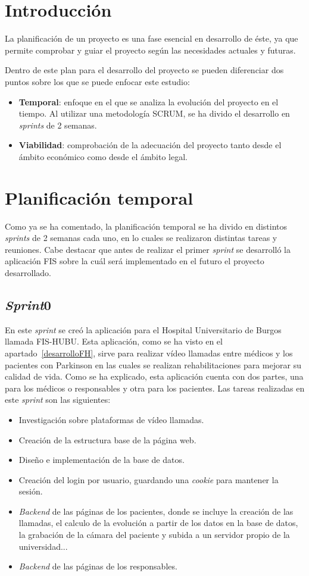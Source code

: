 
\section{Introducción}
La planificación de un proyecto es una fase esencial en desarrollo de éste, ya que permite comprobar y guiar el proyecto según las necesidades actuales y futuras.

Dentro de este plan para el desarrollo del proyecto se pueden diferenciar dos puntos sobre los que se puede enfocar este estudio:
\begin{itemize}
	\item \textbf{Temporal}: enfoque en el que se analiza la evolución del proyecto en el tiempo. Al utilizar una metodología SCRUM, se ha divido el desarrollo en \textit{sprints} de 2 semanas.
	\item \textbf{Viabilidad}: comprobación de la adecuación del proyecto tanto desde el ámbito económico como desde el ámbito legal.
\end{itemize}
\section{Planificación temporal}
Como ya se ha comentado, la planificación temporal se ha divido en distintos \textit{sprints} de 2 semanas cada uno, en lo cuales se realizaron distintas tareas y reuniones. Cabe destacar que antes de realizar el primer \textit{sprint} se desarrolló la aplicación FIS sobre la cuál será implementado en el futuro el proyecto desarrollado.

\subsection{\textit{Sprint}0}
En este \textit{sprint} se creó la aplicación para el Hospital Universitario de Burgos llamada FIS-HUBU. Esta aplicación, como se ha visto en el apartado~\ref{desarrolloFH}, sirve para realizar vídeo llamadas entre médicos y los pacientes con Parkinson en las cuales se realizan rehabilitaciones para mejorar su calidad de vida. Como se ha explicado, esta aplicación cuenta con dos partes, una para los médicos o responsables y otra para los pacientes. Las tareas realizadas en este \textit{sprint} son las siguientes:
\begin{itemize}
	\item Investigación sobre plataformas de vídeo llamadas.
	\item Creación de la estructura base de la página web.
	\item Diseño e implementación de la base de datos.
	\item Creación del login por usuario, guardando una \textit{cookie} para mantener la sesión.
	\item \textit{Backend} de las páginas de los pacientes, donde se  incluye la creación de las llamadas, el calculo de la evolución a partir de los datos en la base de datos, la grabación de la cámara del paciente y subida a un servidor propio de la universidad...
	\item \textit{Backend} de las páginas de los responsables.
\end{itemize}

